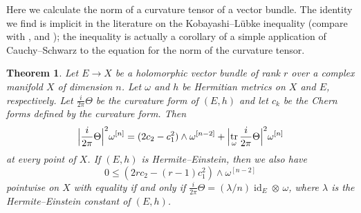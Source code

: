 \documentclass[11pt,a4paper]{amsart}
\def\^#1{^{[#1]}}
\DeclareMathOperator{\tr}{tr}
\DeclareMathOperator{\id}{id}
\def\curv{\frac{i}{2\pi} \Theta}
\newtheorem{theo}{Theorem}[section]
\theoremstyle{definition}
\theoremstyle{remark}
\numberwithin{equation}{section}
\begin{document}
Here we calculate the norm of a curvature tensor of a vector
bundle. The identity we find is implicit in the literature on the
Kobayashi--L\"{u}bke inequality (compare with \cite{Chen-Ogiue},
\cite{Lubke} and \cite{Siu}); the inequality is actually a corollary of a
simple application of Cauchy--Schwarz to the equation for the norm of the
curvature tensor.

\begin{theo}
    Let $E \to X$ be a holomorphic vector bundle of rank $r$ over a complex
manifold $X$ of dimension $n$. Let $\omega$ and $h$ be Hermitian metrics on
$X$ and $E$, respectively. Let $\curv$ be the curvature form of $(E,h)$
and let $c_k$ be the Chern forms defined by the curvature form. Then
$$
\Bigl\lvert \curv \Bigr\rvert^2 \omega\^n
= (2 c_2 - c_1^2) \wedge \omega\^{n-2}
+ \Bigl\lvert \tr_\omega \curv \Bigr\rvert^2 \omega\^n
$$
at every point of $X$. If $(E,h)$ is Hermite--Einstein, then we also have
$$
0 \leq 
(2r c_2 - (r-1) c_1^2) \wedge \omega\^{n-2}
$$
pointwise on $X$ with equality if and only if $\curv = (\lambda/n) \id_E
\otimes\, \omega$, where $\lambda$ is the Hermite--Einstein constant of
$(E,h)$.
\end{theo}
\end{document}

